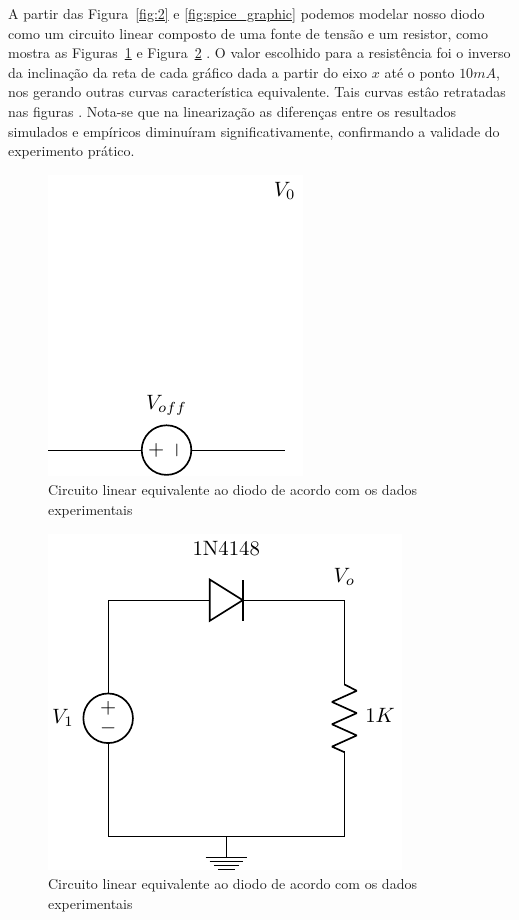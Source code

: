 \documentclass[12pt,a4paper]{article}
\begin{document}
A partir das Figura~\ref{fig:2} e \ref{fig:spice_graphic} podemos modelar nosso diodo como um circuito linear composto de uma fonte de tensão e um resistor, como mostra as Figuras~\ref{fig:circ_equiv} e Figura~\ref{fig:circ_equiv_simul} . O valor escolhido para a resistência foi o inverso da inclinação da reta de cada gráfico dada a partir do eixo $x$ até o ponto $10mA$, nos gerando outras curvas característica equivalente. Tais curvas estâo retratadas nas figuras . Nota-se que na linearização as diferenças entre os resultados simulados e empíricos diminuíram significativamente, confirmando a validade do experimento prático.
\begin{figure}[htpb]
  \centering
  \includegraphics{circ_equiv.pdf}
  \caption{Circuito linear equivalente ao diodo de acordo com os dados experimentais}
  \label{fig:circ_equiv}
\end{figure}
\begin{figure}[htpb]
  \centering
  \includegraphics{circ_equiv_simul.pdf}
  \caption{Circuito linear equivalente ao diodo de acordo com os dados experimentais}
  \label{fig:circ_equiv_simul}
\end{figure}
\end{document}
